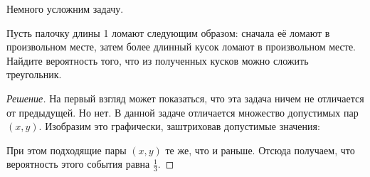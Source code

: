Немного усложним задачу.
\begin{problem}
    Пусть палочку длины 1 ломают следующим образом: сначала её ломают в произвольном месте, затем более длинный кусок ломают в произвольном месте. Найдите вероятность того, что из полученных кусков можно сложить треугольник.
\end{problem}
\begin{proof}[Решение]
    На первый взгляд может показаться, что эта задача ничем не отличается от предыдущей. Но нет. В данной задаче отличается множество допустимых пар \((x, y)\). Изобразим это графически, заштриховав допустимые значения:
    \begin{center}
    \end{center}

    При этом подходящие пары \((x, y)\) те же, что и раньше. Отсюда получаем, что вероятность этого события равна \(\frac{1}{3}\).
\end{proof}